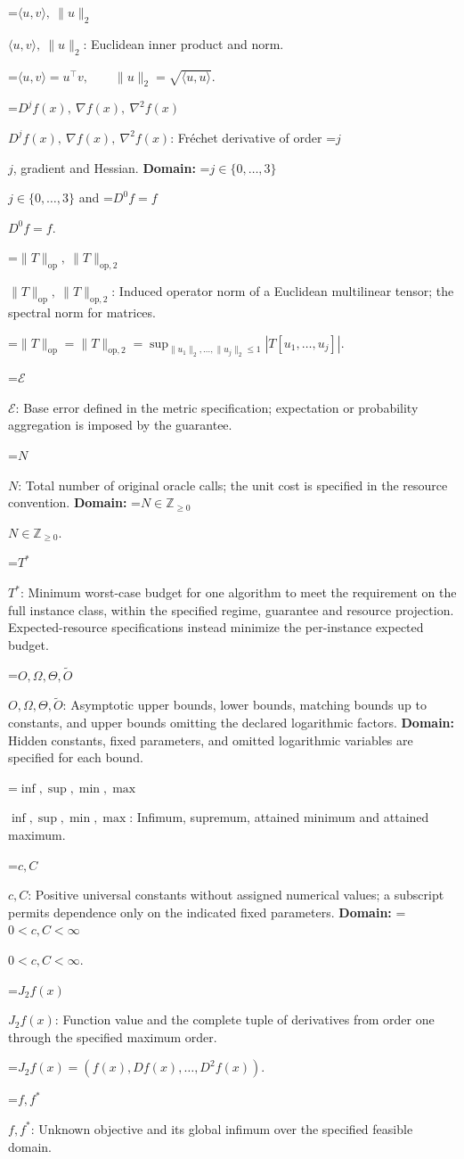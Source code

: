 \documentclass[10pt,a4paper]{article}
\newcommand{\AtlasMath}[1]{\par\begingroup\centering\setbox0=\hbox{$\displaystyle #1$}\ifdim\wd0>1.4\linewidth\typeout{ATLAS WIDE FORMULA: \the\wd0}\fi\ifdim\wd0>\linewidth\resizebox{\linewidth}{!}{\box0}\else\box0\fi\par\endgroup}
\newcommand{\AtlasInlineMath}[1]{\begingroup\setbox0=\hbox{$#1$}\ifdim\wd0>.4\linewidth\endgroup\AtlasMath{#1}\else\endgroup$#1$\fi}
\begin{document}
\AtlasInlineMath{\langle u,v\rangle,\ \|u\|_2}: Euclidean inner product and norm.


\AtlasMath{\langle u,v\rangle=u^\top v,\qquad\|u\|_2=\sqrt{\langle u,u\rangle}.}


\AtlasInlineMath{D^jf(x),\ \nabla f(x),\ \nabla^2f(x)}: Fréchet derivative of order \AtlasInlineMath{j}, gradient and Hessian. \textbf{Domain:} \AtlasInlineMath{j\in\{0,\ldots,3\}} and \AtlasInlineMath{D^0f=f}.

\AtlasInlineMath{\|T\|_{\mathrm{op}},\ \|T\|_{\mathrm{op},2}}: Induced operator norm of a Euclidean multilinear tensor; the spectral norm for matrices.


\AtlasMath{\|T\|_{\mathrm{op}}=\|T\|_{\mathrm{op},2}=\sup_{\|u_1\|_2,\ldots,\|u_j\|_2\le1}|T[u_1,\ldots,u_j]|.}


\AtlasInlineMath{\mathcal{E}}: Base error defined in the metric specification; expectation or probability aggregation is imposed by the guarantee.

\AtlasInlineMath{N}: Total number of original oracle calls; the unit cost is specified in the resource convention. \textbf{Domain:} \AtlasInlineMath{N\in\mathbb{Z}_{\ge0}}.

\AtlasInlineMath{T^*}: Minimum worst-case budget for one algorithm to meet the requirement on the full instance class, within the specified regime, guarantee and resource projection. Expected-resource specifications instead minimize the per-instance expected budget.

\AtlasInlineMath{O,\Omega,\Theta,\widetilde{O}}: Asymptotic upper bounds, lower bounds, matching bounds up to constants, and upper bounds omitting the declared logarithmic factors. \textbf{Domain:} Hidden constants, fixed parameters, and omitted logarithmic variables are specified for each bound.

\AtlasInlineMath{\inf,\sup,\min,\max}: Infimum, supremum, attained minimum and attained maximum.

\AtlasInlineMath{c,C}: Positive universal constants without assigned numerical values; a subscript permits dependence only on the indicated fixed parameters. \textbf{Domain:} \AtlasInlineMath{0<c,C<\infty}.

\AtlasInlineMath{J_{2}f(x)}: Function value and the complete tuple of derivatives from order one through the specified maximum order.


\AtlasMath{J_{2}f(x)=(f(x),Df(x),\ldots,D^{2}f(x)).}


\AtlasInlineMath{f,f^*}: Unknown objective and its global infimum over the specified feasible domain.
\end{document}
